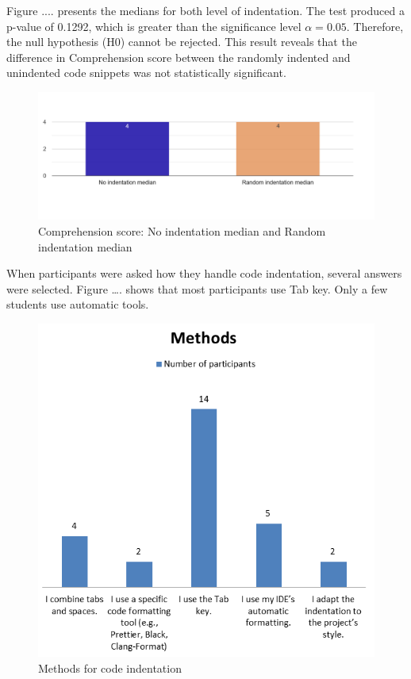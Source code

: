 Figure .... presents the medians for both level of indentation.
The test produced a p-value of 0.1292, which is greater than the significance level \(\alpha = 0.05\). Therefore, the null hypothesis (H0) cannot be rejected. This result reveals that the difference in Comprehension score between the randomly indented and unindented code snippets was not statistically significant.


\begin{figure} [H]
  \centering
  \includegraphics[scale=0.4]{figures/0-r-q3.png}
  \caption{Comprehension score:  No indentation median and Random indentation median}
  \label{fig:AnhangsChor}
\end{figure}



When participants were asked how they handle code indentation, several answers were selected. Figure …. shows that most participants use Tab key. Only a few students use automatic tools.  

\begin{figure} [H]
  \centering
  \includegraphics[scale=0.9]{figures/inM.png}
  \caption{Methods for code indentation}
  \label{fig:AnhangsChor}
\end{figure}



